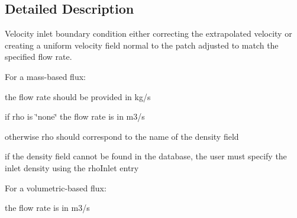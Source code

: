 \subsection{Detailed Description}
Velocity inlet boundary condition either correcting the extrapolated velocity or creating a uniform velocity field normal to the patch adjusted to match the specified flow rate. 

\label{_Description}%
 For a mass-\/based flux\+:
\begin{DoxyItemize}
\item the flow rate should be provided in kg/s
\item if {\ttfamily rho} is \char`\"{}none\char`\"{} the flow rate is in m3/s
\item otherwise {\ttfamily rho} should correspond to the name of the density field
\item if the density field cannot be found in the database, the user must specify the inlet density using the {\ttfamily rho\+Inlet} entry
\end{DoxyItemize}

For a volumetric-\/based flux\+:
\begin{DoxyItemize}
\item the flow rate is in m3/s
\end{DoxyItemize}

